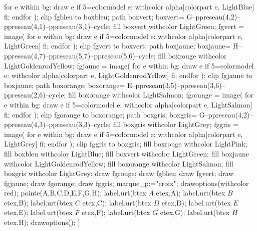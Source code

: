 \begin{corrige}
{{            for e within bg:
                draw e if 5=colormodel e: withcolor alpha[colorpart e, LightBlue] fi;
            endfor
        );
        clip fgbleu to boxbleu;
        path boxvert; boxvert= G--ppreseau(4,2)--ppreseau(4,1)--ppreseau(3,1)--cycle;
        fill boxvert withcolor LightGreen;
        fgvert = image( 
            for e within bg:
                draw e if 5=colormodel e: withcolor alpha[colorpart e, LightGreen] fi;
            endfor
        );
        clip fgvert to boxvert;
        path boxjaune; boxjaune= H--ppreseau(4,7)--ppreseau(5,7)--ppreseau(5,6)--cycle;        
        fill boxrouge withcolor LightGoldenrodYellow;
        fgjaune = image( 
        for e within bg:
            draw e if 5=colormodel e: withcolor alpha[colorpart e, LightGoldenrodYellow] fi;
        endfor
        );
        clip fgjaune to boxjaune; 
        path boxorange; boxorange= E--ppreseau(3,5)--ppreseau(3,6)--ppreseau(2,6)--cycle;
        fill boxorange withcolor LightSalmon;
        fgorange = image( 
            for e within bg:
                draw e if 5=colormodel e: withcolor alpha[colorpart e, LightSalmon] fi;
            endfor
        );
        clip fgorange to boxorange;
        path boxgris; boxgris= G--ppreseau(4,2)--ppreseau(4,3)--ppreseau(3,3)--cycle;
        fill boxgris withcolor LightGrey;
        fggris = image( 
            for e within bg:
                draw e if 5=colormodel e: withcolor alpha[colorpart e, LightGrey] fi;
            endfor
        );
        clip fggris to boxgris;
        fill boxrouge withcolor LightPink;
        fill boxbleu withcolor LightBlue;
        fill boxvert withcolor LightGreen;
        fill boxjaune withcolor LightGoldenrodYellow;
        fill boxorange withcolor LightSalmon;
        fill boxgris withcolor LightGrey;
        draw fgrouge;
        draw fgbleu;
        draw fgvert;
        draw fgjaune;
        draw fgorange;
        draw fggris;
        marque_p:="croix";
        drawoptions(withcolor red);
        pointe(A,B,C,D,E,F,G,H);
        label.urt(btex $A$ etex,A);
        label.urt(btex $B$ etex,B);
        label.urt(btex $C$ etex,C);
        label.urt(btex $D$ etex,D);
        label.urt(btex $E$ etex,E);
        label.urt(btex $F$ etex,F);
        label.urt(btex $G$ etex,G);
        label.urt(btex $H$ etex,H);
        drawoptions();
    }]{}
    }
\end{corrige}

